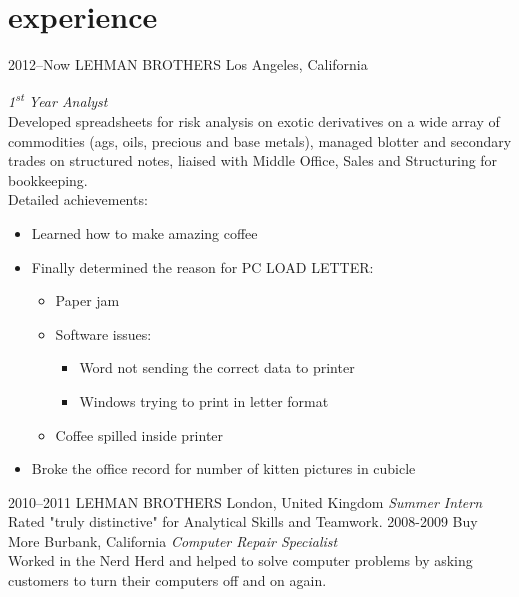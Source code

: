 \documentclass[]{friggeri-cv} %
\begin{document}

\section{experience}

	\begin{entrylist}
		\entry
		{2012--Now}
		{LEHMAN BROTHERS}
		{Los Angeles, California}
		{\emph{1\textsuperscript{st} Year Analyst} \\
		Developed spreadsheets for risk analysis on exotic derivatives on a wide array of commodities (ags, oils, precious and base metals), managed blotter and secondary trades on structured notes, liaised with Middle Office, Sales and Structuring for bookkeeping. \\
Detailed achievements:
		\begin{itemize}
			\item Learned how to make amazing coffee
			\item Finally determined the reason for \textsc{PC LOAD LETTER}:
			\begin{itemize}
				\item Paper jam
				\item Software issues:
				\begin{itemize}
					\item Word not sending the correct data to printer
					\item Windows trying to print in letter format
				\end{itemize}
				\item Coffee spilled inside printer
			\end{itemize}
			\item Broke the office record for number of kitten pictures in cubicle
		\end{itemize}}
		\entry
		{2010--2011}
		{LEHMAN BROTHERS}
		{London, United Kingdom}
		{\emph{Summer Intern} \\
		Rated "truly distinctive" for Analytical Skills and Teamwork.}
		\entry
		{2008-2009}
		{Buy More}
		{Burbank, California}
		{\emph{Computer Repair Specialist} \\
		Worked in the Nerd Herd and helped to solve computer problems by asking customers to turn their computers off and on again.}
	\end{entrylist}
\end{document}
